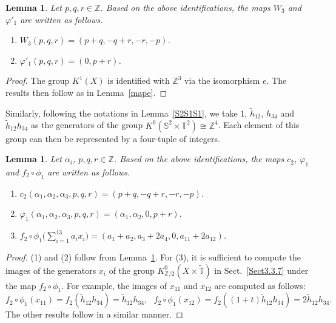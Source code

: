 \documentclass{amsart}
\theoremstyle{plain}
\newtheorem{lemma}[theorem]{Lemma}
\theoremstyle{definition}
\theoremstyle{remark}
\newcommand{\Z}{\mathbb{Z}}
\newcommand{\T}{\mathbb{T}}
\newcommand{\SSS}{\mathbb{S}}
\newcommand{\tT}{\widetilde{\T}}
\newcommand{\thh}{\tilde{h}}
\begin{document}
\begin{lemma}
\label{lem3.20}
Let $p,q,r \in \Z$.
Based on the above identifications, the maps $W_3$ and $\varphi'_1$ are written as follows.
\begin{enumerate}
\item $W_3(p,q,r) = (p+q, -q+r, -r, -p)$.
\item $\varphi'_1(p,q,r) = (0,p+r)$.
\end{enumerate}
\end{lemma}

\begin{proof}
The group $K^1(X)$ is identified with $\Z^3$ via the isomorphism $e$.
The results then follow as in Lemma~\ref{mape}.
\end{proof}

Similarly, following the notations in Lemma~\ref{S2S1S1}, we take $1$, $\thh_{12}$, $h_{34}$ and $\thh_{12}h_{34}$ as the generators of the group $K^0(\SSS^2 \times \T^2) \cong \Z^4$.
Each element of this group can then be represented by a four-tuple of integers.

\begin{lemma}
\label{lem3.21}
Let $\alpha_i$, $p,q,r \in \Z$.
Based on the above identifications, the maps $c_2$, $\varphi_1$ and $f_2 \circ \phi_1$ are written as follows.
\begin{enumerate}
\item $c_2(\alpha_1, \alpha_2, \alpha_3, p,q,r) = (p+q, -q+r, -r, -p)$.
\item $\varphi_1(\alpha_1, \alpha_2, \alpha_3, p,q,r) = (\alpha_1, \alpha_2, 0,p+r)$.
\item $f_2 \circ \phi_1 \bigl(\sum_{i=1}^{13}a_i x_i \bigl) = (a_1 + a_2, a_3 + 2 a_4, 0, a_{11} + 2a_{12})$.
\end{enumerate}
\end{lemma}

\begin{proof}
(1) and (2) follow from Lemma~\ref{lem3.20}.
For (3), it is sufficient to compute the images of the generators $x_i$ of the group $K^0_{\Z/2}(X \times \tT)$ in Sect.~\ref{Sect3.3.7} under the map $f_2 \circ \phi_1$.
For example, the images of $x_{11}$ and $x_{12}$ are computed as follows:
\begin{equation*}
	f_2 \circ \phi_1(x_{11}) = f_2(\thh_{12}h_{34}) = \thh_{12}h_{34}, \ \ \
	f_2 \circ \phi_1(x_{12}) = f_2((1+t)\thh_{12} h_{34}) = 2 \thh_{12}h_{34}.
\end{equation*}
The other results follow in a similar manner.
\end{proof}
\end{document}
